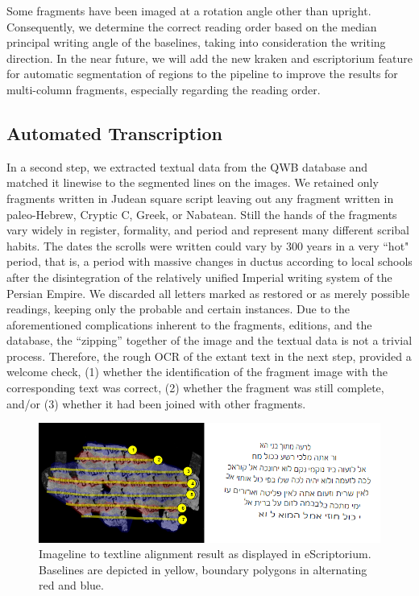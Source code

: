 Some fragments have been imaged at a rotation angle other than upright.
Consequently, we determine the correct reading order based on the median
principal writing angle of the baselines, taking into consideration the writing
direction.  In the near future, we will add the new kraken and escriptorium
feature for automatic segmentation of regions to the pipeline to improve the
results for multi-column fragments, especially regarding the reading
order\cite{KiesslingICFHR2020}. 

\subsection{Automated Transcription}\label{sec:trans}\label{sec:id}

In a second step, we extracted textual data from the QWB database and matched
it linewise to the segmented lines on the images.  We retained only fragments
written in Judean square script leaving out any fragment written in
paleo-Hebrew, Cryptic C, Greek, or Nabatean.  Still the hands of the fragments
vary widely in register, formality, and period and represent many different
scribal habits.  The dates the scrolls were written could vary by 300 years in
a very ``hot" period, that is, a period with massive changes in ductus
according to local schools after the disintegration of the relatively unified
Imperial writing system of the Persian Empire. We discarded all letters marked
as restored or as merely possible readings, keeping only the probable and
certain instances.  Due to the aforementioned complications inherent to the
fragments, editions, and the database, the ``zipping'' together of the image
and the textual data is not a trivial process.  Therefore, the rough OCR of the
extant text in the next step, provided a welcome check, (1) whether the
identification of the fragment image with the corresponding text was correct,
(2) whether the fragment was still complete, and/or (3) whether it had been
joined with other fragments.

\begin{figure}[t]%
	\includegraphics[width=1\columnwidth]{images/40b.PNG}
	\caption{Imageline to textline alignment result as displayed in
	eScriptorium. Baselines are depicted in yellow, boundary polygons in
	alternating red and blue.} \vspace*{-5mm} \label{fig:alignment_result}
\end{figure}


